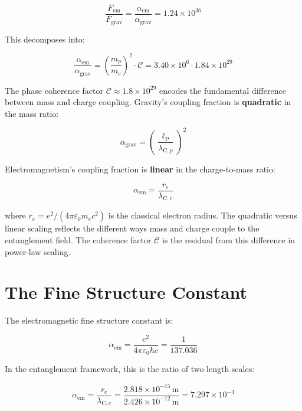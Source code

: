 \documentclass[11pt,letterpaper]{article}
\newcommand{\lambdacp}{\lambda_{\mathrm{C},p}}
\newcommand{\lambdace}{\lambda_{\mathrm{C},e}}
\begin{document}
\begin{equation}
  \frac{F_{\mathrm{em}}}{F_{\mathrm{grav}}}
  = \frac{\alpha_{\mathrm{em}}}{\alpha_{\mathrm{grav}}}
  = 1.24 \times 10^{36}
  \label{eq:force_ratio}
\end{equation}

This decomposes into:

\begin{equation}
  \frac{\alpha_{\mathrm{em}}}{\alpha_{\mathrm{grav}}}
  = \left(\frac{m_p}{m_e}\right)^2 \cdot \mathcal{C}
  = 3.40 \times 10^6 \cdot 1.84 \times 10^{29}
  \label{eq:decomposition}
\end{equation}

The phase coherence factor $\mathcal{C} \approx 1.8 \times 10^{29}$ encodes the fundamental difference between mass and charge coupling. Gravity's coupling fraction is \textbf{quadratic} in the mass ratio:

\begin{equation}
  \alpha_{\mathrm{grav}} = \left(\frac{\ell_{\mathrm{P}}}{\lambdacp}\right)^2
  \label{eq:alpha_grav_quad}
\end{equation}

Electromagnetism's coupling fraction is \textbf{linear} in the charge-to-mass ratio:

\begin{equation}
  \alpha_{\mathrm{em}} = \frac{r_e}{\lambdace}
  \label{eq:alpha_em_linear}
\end{equation}

where $r_e = e^2/(4\pi\varepsilon_0 m_e c^2)$ is the classical electron radius. The quadratic versus linear scaling reflects the different ways mass and charge couple to the entanglement field. The coherence factor $\mathcal{C}$ is the residual from this difference in power-law scaling.

\section{The Fine Structure Constant}

The electromagnetic fine structure constant is:

\begin{equation}
  \alpha_{\mathrm{em}} = \frac{e^2}{4\pi\varepsilon_0\hbar c} = \frac{1}{137.036}
  \label{eq:alpha_em}
\end{equation}

In the entanglement framework, this is the ratio of two length scales:

\begin{equation}
  \alpha_{\mathrm{em}} = \frac{r_e}{\lambdace}
  = \frac{2.818 \times 10^{-15}\,\mathrm{m}}{2.426 \times 10^{-12}\,\mathrm{m}}
  = 7.297 \times 10^{-3}
  \label{eq:alpha_em_ratio}
\end{equation}
\end{document}
